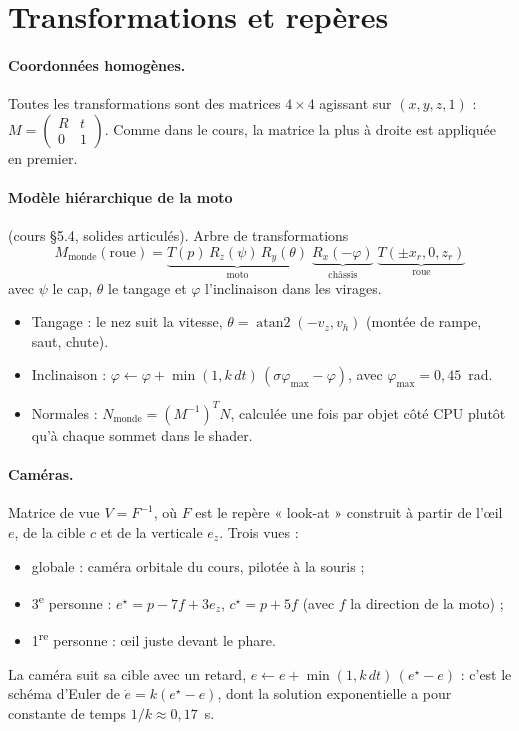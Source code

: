 \documentclass[11pt,a4paper]{article}
\begin{document}
\section{Transformations et repères}

\paragraph{Coordonnées homogènes.} Toutes les transformations sont des matrices $4\times4$ agissant sur $(x,y,z,1)$ :
$M = \begin{pmatrix} R & t \\ 0 & 1 \end{pmatrix}$. Comme dans le cours, la matrice la plus à droite est appliquée en premier.

\paragraph{Modèle hiérarchique de la moto} (cours §5.4, solides articulés). Arbre de transformations
\[
	M_{\text{monde}}(\text{roue}) = \underbrace{T(p)\,R_z(\psi)\,R_y(\theta)}_{\text{moto}}\;\underbrace{R_x(-\varphi)}_{\text{châssis}}\;\underbrace{T(\pm x_r, 0, z_r)}_{\text{roue}}
\]
avec $\psi$ le cap, $\theta$ le tangage et $\varphi$ l'inclinaison dans les virages.
\begin{itemize}
	\item Tangage : le nez suit la vitesse, $\theta = \operatorname{atan2}(-v_z, v_h)$ (montée de rampe, saut, chute).
	\item Inclinaison : $\varphi \leftarrow \varphi + \min(1, k\,dt)\,(\sigma\varphi_{\max} - \varphi)$, avec $\varphi_{\max} = 0{,}45$~rad.
	\item Normales : $N_{\text{monde}} = (M^{-1})^{T} N$, calculée une fois par objet côté CPU plutôt qu'à chaque sommet dans le shader.
\end{itemize}

\paragraph{Caméras.} Matrice de vue $V = F^{-1}$, où $F$ est le repère « look-at » construit à partir de l'œil $e$, de la cible $c$ et de la verticale $e_z$. Trois vues :
\begin{itemize}
	\item globale : caméra orbitale du cours, pilotée à la souris ;
	\item 3\textsuperscript{e} personne : $e^\star = p - 7f + 3e_z$, $c^\star = p + 5f$ (avec $f$ la direction de la moto) ;
	\item 1\textsuperscript{re} personne : œil juste devant le phare.
\end{itemize}
La caméra suit sa cible avec un retard, $e \leftarrow e + \min(1, k\,dt)\,(e^\star - e)$ : c'est le schéma d'Euler de $\dot e = k(e^\star - e)$, dont la solution exponentielle a pour constante de temps $1/k \approx 0{,}17$~s.
\end{document}
